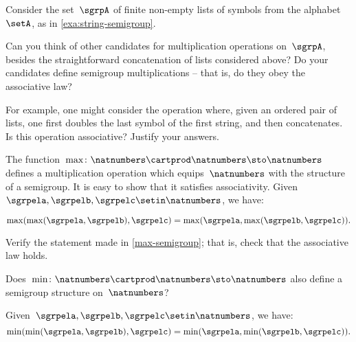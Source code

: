 \begin{gradedexercise}
    \label{ex:VariationsOnConcatenation}
    \label{ex:alphabet}
    Consider the set~$\sgrpA$ of finite non-empty lists of symbols from the alphabet~$\setA$, as in \cref{exa:string-semigroup}.

    Can you think of other candidates for multiplication operations on~$\sgrpA$, besides the straightforward concatenation of lists considered above?
    Do your candidates define semigroup multiplications -- that is, do they obey the associative law?

    For example, one might consider the operation where, given an ordered pair of lists, one first doubles the last symbol of the first string, and then concatenates.
    Is this operation associative?
    Justify your answers.
\end{gradedexercise}

\begin{example}
    \label{max-semigroup}

    The function~$\max \colon \natnumbers \cartprod \natnumbers \sto \natnumbers$ defines a multiplication operation which equips~$\natnumbers$ with the structure of a semigroup.
    It is easy to show that it satisfies associativity.
    Given~$\sgrpela,\sgrpelb,\sgrpelc\setin \natnumbers$, we have:

    \begin{equation*}
        \label{eq:max-assoc}
        \max(\max(\sgrpela,\sgrpelb),\sgrpelc)
        =
        \max(\sgrpela,\max(\sgrpelb,\sgrpelc)).
    \end{equation*}
\end{example}

\begin{exercise}
    \label{ex:max-semigroup}
    Verify the statement made in \cref{max-semigroup}; that is, check that the associative law holds.

    Does~$\min \colon \natnumbers \cartprod \natnumbers \sto \natnumbers$ also define a semigroup structure on~$\natnumbers$?
\end{exercise}
\begin{solution}
    Given~$\sgrpela,\sgrpelb,\sgrpelc\setin \natnumbers$, we have:
    \begin{equation*}
        \label{eq:min-assoc}
        \min(\min(\sgrpela,\sgrpelb),\sgrpelc)=\min(\sgrpela,\min(\sgrpelb,\sgrpelc)).
    \end{equation*}
\end{solution}

